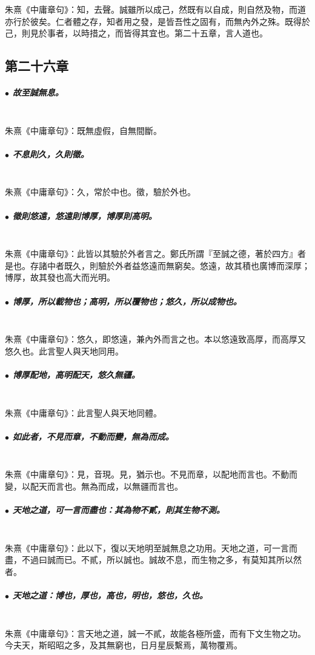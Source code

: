 \documentclass[hyperref, UTF8, 12pt, a4paper]{ctexrep}
\begin{document}
朱熹《中庸章句》：知，去聲。誠雖所以成己，然既有以自成，則自然及物，而道亦行於彼矣。仁者體之存，知者用之發，是皆吾性之固有，而無內外之殊。既得於己，則見於事者，以時措之，而皆得其宜也。第二十五章，言人道也。

\newpage
\subsection{第二十六章}

\subparagraph{$\bullet$ 故至誠無息。} ~\\

朱熹《中庸章句》：既無虛假，自無間斷。

\subparagraph{$\bullet$ 不息則久，久則徵。} ~\\

朱熹《中庸章句》：久，常於中也。徵，驗於外也。

\subparagraph{$\bullet$ 徵則悠遠，悠遠則博厚，博厚則高明。} ~\\

朱熹《中庸章句》：此皆以其驗於外者言之。鄭氏所謂『至誠之德，著於四方』者是也。存諸中者既久，則驗於外者益悠遠而無窮矣。悠遠，故其積也廣博而深厚；博厚，故其發也高大而光明。

\subparagraph{$\bullet$ 博厚，所以載物也；高明，所以覆物也；悠久，所以成物也。} ~\\

朱熹《中庸章句》：悠久，即悠遠，兼內外而言之也。本以悠遠致高厚，而高厚又悠久也。此言聖人與天地同用。

\subparagraph{$\bullet$ 博厚配地，高明配天，悠久無疆。} ~\\

朱熹《中庸章句》：此言聖人與天地同體。

\subparagraph{$\bullet$ 如此者，不見而章，不動而變，無為而成。} ~\\

朱熹《中庸章句》：見，音現。見，猶示也。不見而章，以配地而言也。不動而變，以配天而言也。無為而成，以無疆而言也。

\subparagraph{$\bullet$ 天地之道，可一言而盡也：其為物不貳，則其生物不測。} ~\\

朱熹《中庸章句》：此以下，復以天地明至誠無息之功用。天地之道，可一言而盡，不過曰誠而已。不貳，所以誠也。誠故不息，而生物之多，有莫知其所以然者。

\subparagraph{$\bullet$ 天地之道：博也，厚也，高也，明也，悠也，久也。} ~\\

朱熹《中庸章句》：言天地之道，誠一不貳，故能各極所盛，而有下文生物之功。今夫天，斯昭昭之多，及其無窮也，日月星辰繫焉，萬物覆焉。
\end{document}
